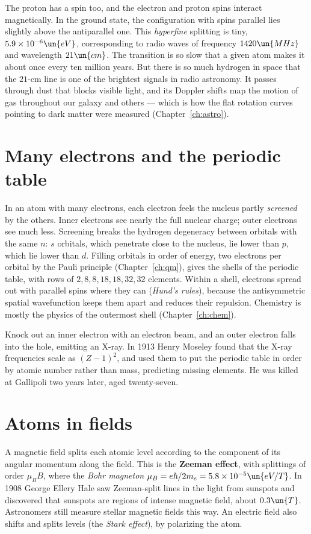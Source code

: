 The proton has a spin too, and the electron and proton spins interact magnetically. In the ground state, the configuration with spins parallel lies slightly above the antiparallel one. This \emph{hyperfine} splitting is tiny, $5.9\times10^{-6}\un{eV}$, corresponding to radio waves of frequency $1420\un{MHz}$ and wavelength $21\un{cm}$. The transition is so slow that a given atom makes it about once every ten million years. But there is so much hydrogen in space that the $21$-cm line is one of the brightest signals in radio astronomy. It passes through dust that blocks visible light, and its Doppler shifts map the motion of gas throughout our galaxy and others --- which is how the flat rotation curves pointing to dark matter were measured (Chapter~\ref{ch:astro}).

\section{Many electrons and the periodic table}

In an atom with many electrons, each electron feels the nucleus partly \emph{screened} by the others. Inner electrons see nearly the full nuclear charge; outer electrons see much less. Screening breaks the hydrogen degeneracy between orbitals with the same $n$: $s$ orbitals, which penetrate close to the nucleus, lie lower than $p$, which lie lower than $d$. Filling orbitals in order of energy, two electrons per orbital by the Pauli principle (Chapter~\ref{ch:qm}), gives the shells of the periodic table, with rows of $2, 8, 8, 18, 18, 32, 32$ elements. Within a shell, electrons spread out with parallel spins where they can (\emph{Hund's rules}), because the antisymmetric spatial wavefunction keeps them apart and reduces their repulsion. Chemistry is mostly the physics of the outermost shell (Chapter~\ref{ch:chem}).

Knock out an inner electron with an electron beam, and an outer electron falls into the hole, emitting an X-ray. In 1913 Henry Moseley found that the X-ray frequencies scale as $(Z-1)^2$, and used them to put the periodic table in order by atomic number rather than mass, predicting missing elements. He was killed at Gallipoli two years later, aged twenty-seven.

\section{Atoms in fields}

A magnetic field splits each atomic level according to the component of its angular momentum along the field. This is the \textbf{Zeeman effect}, with splittings of order $\mu_BB$, where the \emph{Bohr magneton} $\mu_B = e\hbar/2m_e = 5.8\times10^{-5}\un{eV/T}$. In 1908 George Ellery Hale saw Zeeman-split lines in the light from sunspots and discovered that sunspots are regions of intense magnetic field, about $0.3\un{T}$. Astronomers still measure stellar magnetic fields this way. An electric field also shifts and splits levels (the \emph{Stark effect}), by polarizing the atom.

